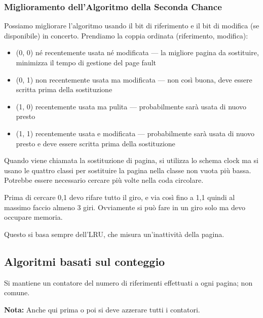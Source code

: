 \subsubsection{Miglioramento dell'Algoritmo della Seconda Chance}


Possiamo migliorare l'algoritmo usando il bit di riferimento e il bit di modifica (se disponibile) in concerto. Prendiamo la coppia ordinata (riferimento, modifica):
\begin{itemize}
  \item (0, 0) né recentemente usata né modificata --- la migliore pagina da sostituire, minimizza il tempo di gestione del page fault
  \item (0, 1) non recentemente usata ma modificata --- non così buona, deve essere scritta prima della sostituzione
  \item (1, 0) recentemente usata ma pulita --- probabilmente sarà usata di nuovo presto
  \item (1, 1) recentemente usata e modificata --- probabilmente sarà usata di nuovo presto e deve essere scritta prima della sostituzione
\end{itemize}
Quando viene chiamata la sostituzione di pagina, si utilizza lo schema clock ma si usano le quattro classi per sostituire la pagina nella classe non vuota più bassa. Potrebbe essere necessario cercare più volte nella coda circolare.


Prima di cercare 0,1 devo rifare tutto il giro, e via così fino a 1,1 quindi al massimo
faccio almeno 3 giri. Ovviamente si può fare in un giro solo ma devo
occupare memoria.


Questo si basa sempre dell'LRU, che misura un'inattività della pagina.



\subsection{Algoritmi basati sul conteggio}
Si mantiene un contatore del numero di riferimenti effettuati a ogni pagina; non comune.

\begin{tcolorbox}
  \textbf{Nota:}  Anche qui prima o poi si deve azzerare tutti i contatori.
\end{tcolorbox}


